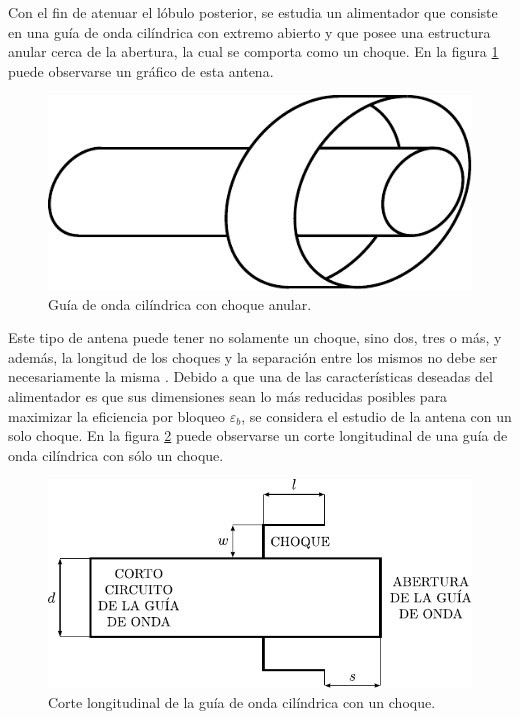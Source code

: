 Con el fin de atenuar el lóbulo posterior, se estudia un alimentador que consiste en una guía de onda cilíndrica con extremo abierto y que posee una estructura anular cerca de la abertura, la cual se comporta como un choque. En la figura \ref{fig_estudio:54} puede observarse un gráfico de esta antena.
\begin{figure}[H]
\centering
\includegraphics[scale = 1]{Figures/Estudio/estudio_54}
\caption{Guía de onda cilíndrica con choque anular.}
\label{fig_estudio:54}
\end{figure}
Este tipo de antena puede tener no solamente un choque, sino dos, tres o más, y además, la longitud de los choques y la separación entre los mismos no debe ser necesariamente la misma \cite{James}. Debido a que una de las características deseadas del alimentador es que sus dimensiones sean lo más reducidas posibles para maximizar la eficiencia por bloqueo $\varepsilon_b$, se considera el estudio de la antena con un solo choque. En la figura \ref{fig_estudio:55} puede observarse un corte longitudinal de una guía de onda cilíndrica con sólo un choque.
\begin{figure}[H]
\centering
\includegraphics[scale = 1]{Figures/Estudio/estudio_55}
\caption{Corte longitudinal de la guía de onda cilíndrica con un choque.}
\label{fig_estudio:55}
\end{figure}
